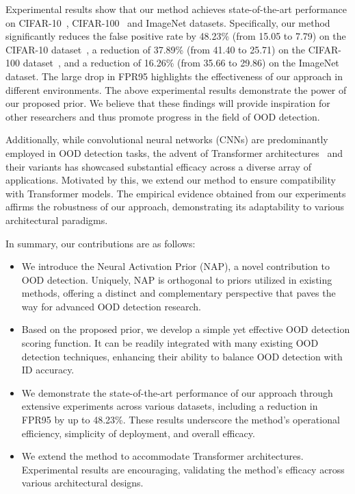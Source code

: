 Experimental results show that our method achieves state-of-the-art performance on CIFAR-10~\cite{krizhevsky2009cifar}, CIFAR-100~\cite{krizhevsky2009cifar} and ImageNet datasets. Specifically, our method significantly reduces the false positive rate by 48.23\% (from 15.05 to 7.79) on the CIFAR-10 dataset~\cite{krizhevsky2009cifar}, a reduction of 37.89\% (from 41.40 to 25.71) on the CIFAR-100 dataset~\cite{krizhevsky2009cifar}, and a reduction of 16.26\% (from 35.66 to 29.86) on the ImageNet dataset. The large drop in FPR95 highlights the effectiveness of our approach in different environments.
The above experimental results demonstrate the power of our proposed prior. We believe that these findings will provide inspiration for other researchers and thus promote progress in the field of OOD detection.

Additionally, while convolutional neural networks (CNNs) are predominantly employed in OOD detection tasks, the advent of Transformer architectures~\cite{vaswani2017attention} and their variants has showcased substantial efficacy across a diverse array of applications. Motivated by this, we extend our method to ensure compatibility with Transformer models. The empirical evidence obtained from our experiments affirms the robustness of our approach, demonstrating its adaptability to various architectural paradigms.

In summary, our contributions are as follows:
\begin{itemize}
\item We introduce the Neural Activation Prior (NAP), a novel contribution to OOD detection. Uniquely, NAP is orthogonal to priors utilized in existing methods, offering a distinct and complementary perspective that paves the way for advanced OOD detection research.
\item Based on the proposed prior, we develop a simple yet effective OOD detection scoring function. 
It can be readily integrated with many existing OOD detection techniques, enhancing their ability to balance OOD detection with ID accuracy.
\item We demonstrate the state-of-the-art performance of our approach through extensive experiments across various datasets, including a reduction in FPR95 by up to 48.23\%. These results underscore the method's operational efficiency, simplicity of deployment, and overall efficacy. 
\item We extend the method to accommodate Transformer architectures. Experimental results are encouraging, validating the method's efficacy across various architectural designs.
\end{itemize}